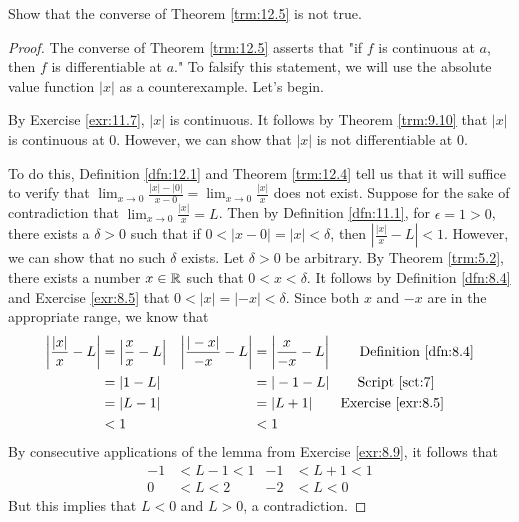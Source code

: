 \documentclass[../main.tex]{subfiles}
\begin{document}
\begin{exercise}\label{exr:12.6}
    Show that the converse of Theorem \ref{trm:12.5} is not true.
    \begin{proof}
        The converse of Theorem \ref{trm:12.5} asserts that "if $f$ is continuous at $a$, then $f$ is differentiable at $a$." To falsify this statement, we will use the absolute value function $|x|$ as a counterexample. Let's begin.\par
        By Exercise \ref{exr:11.7}, $|x|$ is continuous. It follows by Theorem \ref{trm:9.10} that $|x|$ is continuous at 0. However, we can show that $|x|$ is not differentiable at 0.\par
        To do this, Definition \ref{dfn:12.1} and Theorem \ref{trm:12.4} tell us that it will suffice to verify that $\lim_{x\to 0}\frac{|x|-|0|}{x-0}=\lim_{x\to 0}\frac{|x|}{x}$ does not exist. Suppose for the sake of contradiction that $\lim_{x\to 0}\frac{|x|}{x}=L$. Then by Definition \ref{dfn:11.1}, for $\epsilon=1>0$, there exists a $\delta>0$ such that if $0<|x-0|=|x|<\delta$, then $|\frac{|x|}{x}-L|<1$. However, we can show that no such $\delta$ exists. Let $\delta>0$ be arbitrary. By Theorem \ref{trm:5.2}, there exists a number $x\in\mathbb{R}$ such that $0<x<\delta$. It follows by Definition \ref{dfn:8.4} and Exercise \ref{exr:8.5} that $0<|x|=|-x|<\delta$. Since both $x$ and $-x$ are in the appropriate range, we know that
        \begin{align*}
            \left| \frac{|x|}{x}-L \right| &= \left| \frac{x}{x}-L \right|&
                \left| \frac{|-x|}{-x}-L \right| &= \left| \frac{x}{-x}-L \right|\tag*{Definition \ref{dfn:8.4}}\\
            &= |1-L|&
                &= |-1-L|\tag*{Script \ref{sct:7}}\\
            &= |L-1|&
                &= |L+1|\tag*{Exercise \ref{exr:8.5}}\\
            &< 1&
                &< 1
        \end{align*}
        By consecutive applications of the lemma from Exercise \ref{exr:8.9}, it follows that
        \begin{align*}
            -1 &< L-1 < 1&
                -1 &< L+1 < 1\\
            0 &< L < 2&
                -2 &< L < 0
        \end{align*}
        But this implies that $L<0$ and $L>0$, a contradiction.
    \end{proof}
\end{exercise}
\end{document}
